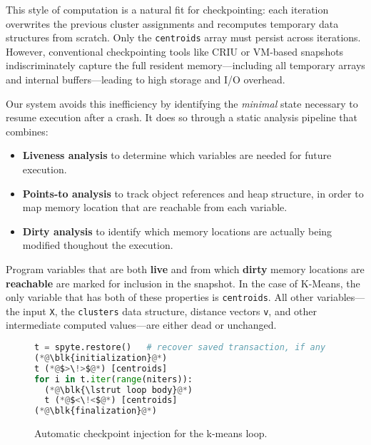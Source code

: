 This style of computation is a natural fit for checkpointing: each iteration overwrites the previous cluster assignments and recomputes temporary data structures from scratch. Only the \texttt{centroids} array must persist across iterations. However, conventional checkpointing tools like CRIU or VM-based snapshots indiscriminately capture the full resident memory---including all temporary arrays and internal buffers---leading to high storage and I/O overhead.

Our system avoids this inefficiency by identifying the \emph{minimal} state necessary to resume execution after a crash. It does so through a static analysis pipeline that combines:
\begin{itemize}
    \item \textbf{Liveness analysis} to determine which variables are needed for future execution.
    \item \textbf{Points-to analysis} to track object references and heap structure, in order to map memory
location that are reachable from each variable.
    \item \textbf{Dirty analysis} to identify which memory locations are actually being modified thoughout the execution.
\end{itemize}

Program variables that are both \textbf{live} and from which \textbf{dirty} memory locations are \textbf{reachable}
are marked for inclusion in the snapshot.
In the case of K-Means, the only variable that has both of these properties is \lstinline|centroids|.
All other variables---the input \lstinline|X|, the \lstinline|clusters| data structure, distance vectors \lstinline|v|, and other intermediate computed values---are either dead or unchanged.

\begin{figure}[t]
\newcommand\blk[1]{%
  \tikz[baseline=(a.base)]
  \node(a)[draw, dashed, dash pattern=on 2pt off 1pt, minimum height=15pt] {\# #1}; }
\newcommand\lstrut{%
  \rule[-.3\baselineskip]{0pt}{1.1\baselineskip}}
\centering
\begin{lstlisting}[language=python]
t = spyte.restore()   # recover saved transaction, if any
(*@\blk{initialization}@*)
t (*@$>\!>$@*) [centroids]
for i in t.iter(range(niters)):
  (*@\blk{\lstrut loop body}@*)
  t (*@$<\!<$@*) [centroids]
(*@\blk{finalization}@*)
\end{lstlisting}
\caption{Automatic checkpoint injection for the k-means loop.}
\label{fig:checkpoint-injection}
\end{figure}

